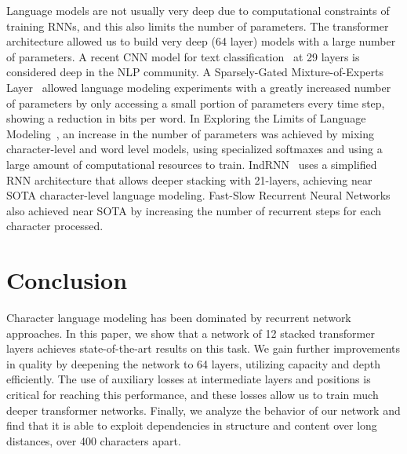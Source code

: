 \documentclass[letterpaper]{article}
\begin{document}
Language models are not usually very deep due to computational constraints of training RNNs, and this also limits the number of parameters. The transformer architecture allowed us to build very deep (64 layer) models with a large number of parameters. A recent CNN model for text classification~\cite{DBLP:journals/corr/ConneauSBL16} at 29 layers is considered deep in the NLP community. A Sparsely-Gated Mixture-of-Experts Layer~\cite{DBLP:journals/corr/ShazeerMMDLHD17} allowed language modeling experiments with a greatly increased number of parameters by only accessing a small portion of parameters every time step, showing a reduction in bits per word. In Exploring the Limits of Language Modeling~\cite{DBLP:journals/corr/JozefowiczVSSW16}, an increase in the number of parameters was achieved by mixing character-level and word level models, using specialized softmaxes and using a large amount of computational resources to train. IndRNN~\cite{DBLP:journals/corr/abs-1803-04831} uses a simplified RNN architecture that allows deeper stacking with 21-layers, achieving near SOTA character-level language modeling. Fast-Slow Recurrent Neural Networks~\cite{mujika2017fast} also achieved near SOTA by increasing the number of recurrent steps for each character processed.

\section{Conclusion}
Character language modeling has been dominated by recurrent network approaches.
In this paper, we show that a network of 12 stacked transformer layers achieves state-of-the-art results on this task.
We gain further improvements in quality by deepening the network to 64 layers, utilizing capacity and depth efficiently.
The use of auxiliary losses at intermediate layers and positions is critical for reaching this performance, and these losses allow us to train much deeper transformer networks.
Finally, we analyze the behavior of our network and find that it is able to exploit dependencies in structure and content over long distances, over 400 characters apart.



\fontsize{9.5pt}{10.5pt} \selectfont 


\end{document}
